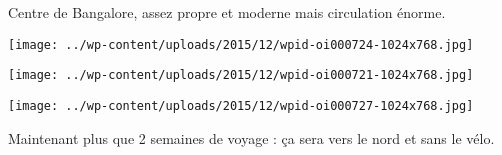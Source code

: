 Centre de Bangalore, assez propre et moderne mais circulation énorme. 
\begin{center} \texttt{[image: ../wp-content/uploads/2015/12/wpid-oi000724-1024x768.jpg]} \end{center}
\begin{center} \texttt{[image: ../wp-content/uploads/2015/12/wpid-oi000721-1024x768.jpg]} \end{center}
\begin{center} \texttt{[image: ../wp-content/uploads/2015/12/wpid-oi000727-1024x768.jpg]} \end{center}

Maintenant plus que 2 semaines de voyage : ça sera vers le nord et sans le vélo.
